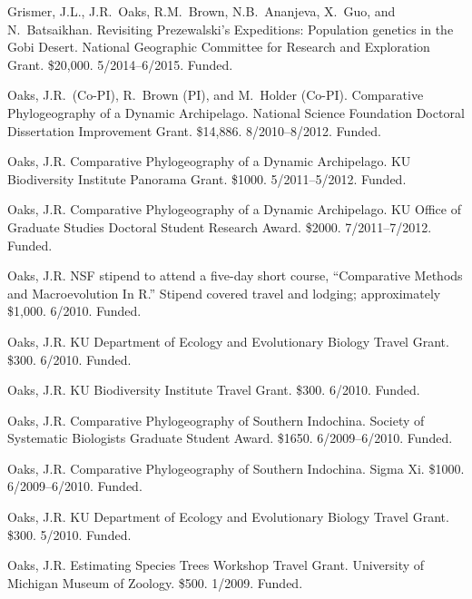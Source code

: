 \myHangIndent
Grismer, J.L., J.R.\ Oaks, R.M.\ Brown, N.B.\ Ananjeva, X.\ Guo, and N.\
Batsaikhan.
Revisiting Prezewalski's Expeditions: Population genetics in the Gobi Desert.
National Geographic Committee for Research and Exploration Grant.
\$20,000.
5/2014--6/2015.
Funded.

\myHangIndent
Oaks, J.R.\ (Co-PI), R.\ Brown (PI), and M.\ Holder (Co-PI).
Comparative Phylogeography of a Dynamic Archipelago.
National Science Foundation Doctoral Dissertation Improvement Grant.
\$14,886.
8/2010--8/2012.
Funded.

\myHangIndent
Oaks, J.R.
Comparative Phylogeography of a Dynamic Archipelago.
KU Biodiversity Institute Panorama Grant.
\$1000.
5/2011--5/2012.
Funded.

\myHangIndent
Oaks, J.R.
Comparative Phylogeography of a Dynamic Archipelago.
KU Office of Graduate Studies Doctoral Student Research Award.
\$2000.
7/2011--7/2012.
Funded.

\myHangIndent
Oaks, J.R.
NSF stipend to attend a five-day short course, ``Comparative Methods and
Macroevolution In R.''
Stipend covered travel and lodging; approximately \$1,000.
6/2010.
Funded.

\myHangIndent
Oaks, J.R.
KU Department of Ecology and Evolutionary Biology Travel Grant.
\$300.
6/2010.
Funded.

\myHangIndent
Oaks, J.R.
KU Biodiversity Institute Travel Grant.
\$300.
6/2010.
Funded.

\myHangIndent
Oaks, J.R.
Comparative Phylogeography of Southern Indochina.
Society of Systematic Biologists Graduate Student Award.
\$1650.
6/2009--6/2010.
Funded.

\myHangIndent
Oaks, J.R.
Comparative Phylogeography of Southern Indochina.
Sigma Xi.
\$1000.
6/2009--6/2010.
Funded.

\myHangIndent
Oaks, J.R.
KU Department of Ecology and Evolutionary Biology Travel Grant.
\$300.
5/2010.
Funded.

\myHangIndent
Oaks, J.R.
Estimating Species Trees Workshop Travel Grant.
University of Michigan Museum of Zoology.
\$500.
1/2009.
Funded.

